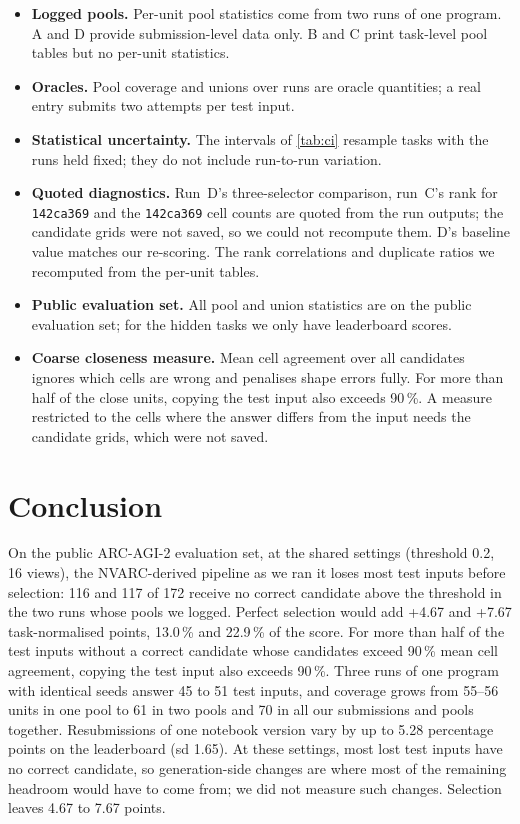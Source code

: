 \documentclass[11pt]{article}
\newcommand{\code}[1]{\texttt{#1}}
\begin{document}
\begin{itemize}
\item \textbf{Logged pools.} Per-unit pool statistics come from two runs of one program. A and D provide submission-level data only. B and C print task-level pool tables but no per-unit statistics.
\item \textbf{Oracles.} Pool coverage and unions over runs are oracle quantities; a real entry submits two attempts per test input.
\item \textbf{Statistical uncertainty.} The intervals of \cref{tab:ci} resample tasks with the runs held fixed; they do not include run-to-run variation.
\item \textbf{Quoted diagnostics.} Run~D's three-selector comparison, run~C's rank for \code{142ca369} and the \code{142ca369} cell counts are quoted from the run outputs; the candidate grids were not saved, so we could not recompute them. D's baseline value matches our re-scoring. The rank correlations and duplicate ratios we recomputed from the per-unit tables.
\item \textbf{Public evaluation set.} All pool and union statistics are on the public evaluation set; for the hidden tasks we only have leaderboard scores.
\item \textbf{Coarse closeness measure.} Mean cell agreement over all candidates ignores which cells are wrong and penalises shape errors fully. For more than half of the close units, copying the test input also exceeds 90\,\%. A measure restricted to the cells where the answer differs from the input needs the candidate grids, which were not saved.
\end{itemize}

\section{Conclusion}

On the public ARC-AGI-2 evaluation set, at the shared settings (threshold 0.2, 16 views), the NVARC-derived pipeline as we ran it loses most test inputs before selection: 116 and 117 of 172 receive no correct candidate above the threshold in the two runs whose pools we logged.
Perfect selection would add +4.67 and +7.67 task-normalised points, 13.0\,\% and 22.9\,\% of the score. For more than half of the test inputs without a correct candidate whose candidates exceed 90\,\% mean cell agreement, copying the test input also exceeds 90\,\%.
Three runs of one program with identical seeds answer 45 to 51 test inputs, and coverage grows from 55--56 units in one pool to 61 in two pools and 70 in all our submissions and pools together. Resubmissions of one notebook version vary by up to 5.28 percentage points on the leaderboard (sd 1.65).
At these settings, most lost test inputs have no correct candidate, so generation-side changes are where most of the remaining headroom would have to come from; we did not measure such changes. Selection leaves 4.67 to 7.67 points.
\end{document}
